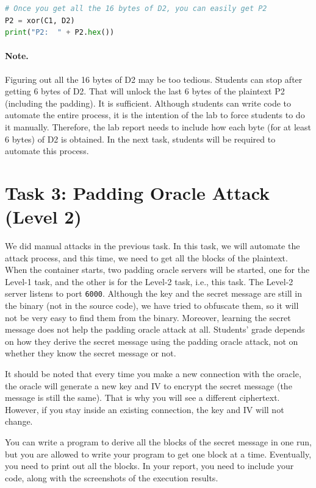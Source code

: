 \begin{lstlisting}[language=python]
# Once you get all the 16 bytes of D2, you can easily get P2
P2 = xor(C1, D2)
print("P2:  " + P2.hex())
\end{lstlisting}
 
\paragraph{Note.} Figuring out all the 16 bytes of D2 may be too
tedious. Students can stop after getting 6 bytes of D2. That will 
unlock the last 6 bytes of the plaintext P2 (including
the padding). It is sufficient. 
Although students can write code to automate the entire process, it is the 
intention of the lab to force students to do it manually. 
Therefore, the lab report needs to include how each byte (for at least 6 bytes) 
of D2 is obtained. 
In the next task, students will be required to automate this process. 


\section{Task 3: Padding Oracle Attack (Level 2)}


We did manual attacks in the previous task. In this task,
we will automate the attack process, and this time, we 
need to get all the blocks of the plaintext. When the 
container starts, two padding oracle servers will be started, one for the 
Level-1 task, and the other is for the Level-2 task, i.e.,
this task. The Level-2 server listens to port \texttt{6000}. 
Although the key and the secret message are still in the 
binary (not in the source code), we have tried to 
obfuscate them, so it will not be very easy to 
find them from the binary. Moreover, learning the secret
message does not help the padding oracle attack at all. Students'
grade depends on how they derive the secret message using
the padding oracle attack, not on whether they know the secret message
or not.


It should be noted that every time you make a new connection with the 
oracle, the oracle will generate a new key and IV to encrypt the 
secret message (the message is still the same). That is why
you will see a different ciphertext. 
However, if you stay inside an existing connection, 
the key and IV will not change. 


You can write a program to derive all the blocks
of the secret message in one run, but 
you are allowed to write your program to get one block 
at a time. Eventually, you need to print out all the 
blocks. In your report, you need to include your code, along with 
the screenshots of the execution results. 



